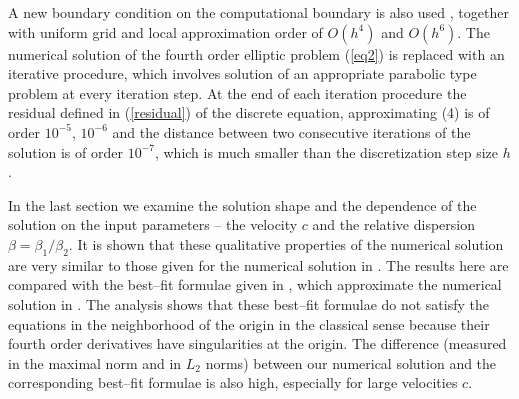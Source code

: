 \documentclass[leqno,11pt]{book}
\newcommand{\rf}[1]{(\ref{#1})}
\begin{document}
A new boundary condition on the computational boundary is also used \cite{bnd}, together with uniform grid and local approximation order of $O(h^4)$ and $O(h^6)$. The numerical solution of the fourth order elliptic problem \rf{eq2} is replaced with an iterative procedure, which involves solution  of an appropriate  parabolic type problem at every iteration step. %
At the end of each iteration procedure the residual defined in \rf{residual}  of the discrete equation, approximating (4) is of order $10^{-5}$, $10^{-6}$ and the distance between two consecutive iterations of the solution is of order $10^{-7}$, which is much smaller than the discretization step size $h$.
 
In the last section we examine the solution shape and the dependence of the solution on the input  parameters -- the velocity $c$ and the relative dispersion $\beta =\beta_1  / \beta_2$. It is shown that these qualitative properties of the numerical solution are very similar to those given for the  numerical solution in \cite{Ch2012,Ch2011}. 
The results here are compared with the best--fit formulae given in \cite{Ch2011}, which approximate the numerical solution in \cite{Ch2012,Ch2011}. 
The analysis  shows that  these best--fit formulae do not satisfy the equations in the neighborhood of the origin in the classical sense because their fourth order derivatives have singularities at the origin.  The  difference (measured in the maximal norm and in $L_2$ norms)  between our numerical solution and the corresponding best--fit formulae is also high, especially  for large velocities $c$. 
\end{document}
